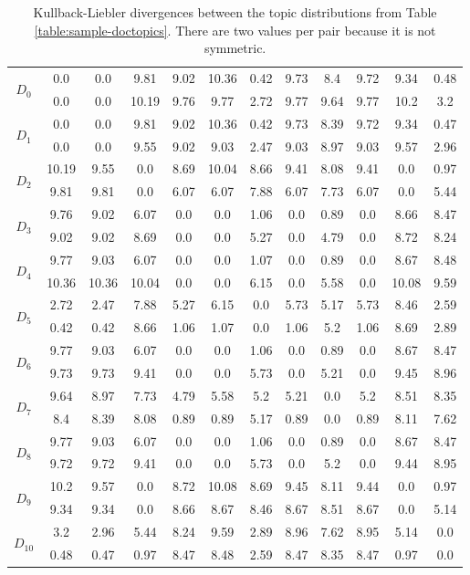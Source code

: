 \begin{table}[!htbp]
\centering%
\small
\begin{tabularx}{\linewidth}{CCCCCCCCCCCC}
\toprule
\heading{} &  &  &  &  &  &  &  &  &  &  &  \\
\midrule
\midrule
{}&0.0&0.0&9.81&9.02&10.36&0.42&9.73&8.4&9.72&9.34&0.48\\
&0.0&0.0&10.19&9.76&9.77&2.72&9.77&9.64&9.77&10.2&3.2\\
\midrule
{}&0.0&0.0&9.81&9.02&10.36&0.42&9.73&8.39&9.72&9.34&0.47\\
&0.0&0.0&9.55&9.02&9.03&2.47&9.03&8.97&9.03&9.57&2.96\\
\midrule
{}&10.19&9.55&0.0&8.69&10.04&8.66&9.41&8.08&9.41&0.0&0.97\\
&9.81&9.81&0.0&6.07&6.07&7.88&6.07&7.73&6.07&0.0&5.44\\
\midrule
{}&9.76&9.02&6.07&0.0&0.0&1.06&0.0&0.89&0.0&8.66&8.47\\
&9.02&9.02&8.69&0.0&0.0&5.27&0.0&4.79&0.0&8.72&8.24\\
\midrule
{}&9.77&9.03&6.07&0.0&0.0&1.07&0.0&0.89&0.0&8.67&8.48\\
&10.36&10.36&10.04&0.0&0.0&6.15&0.0&5.58&0.0&10.08&9.59\\
\midrule
{}&2.72&2.47&7.88&5.27&6.15&0.0&5.73&5.17&5.73&8.46&2.59\\
&0.42&0.42&8.66&1.06&1.07&0.0&1.06&5.2&1.06&8.69&2.89\\
\midrule
{}&9.77&9.03&6.07&0.0&0.0&1.06&0.0&0.89&0.0&8.67&8.47\\
&9.73&9.73&9.41&0.0&0.0&5.73&0.0&5.21&0.0&9.45&8.96\\
\midrule
{}&9.64&8.97&7.73&4.79&5.58&5.2&5.21&0.0&5.2&8.51&8.35\\
&8.4&8.39&8.08&0.89&0.89&5.17&0.89&0.0&0.89&8.11&7.62\\
\midrule
{}&9.77&9.03&6.07&0.0&0.0&1.06&0.0&0.89&0.0&8.67&8.47\\
&9.72&9.72&9.41&0.0&0.0&5.73&0.0&5.2&0.0&9.44&8.95\\
\midrule
{}&10.2&9.57&0.0&8.72&10.08&8.69&9.45&8.11&9.44&0.0&0.97\\
&9.34&9.34&0.0&8.66&8.67&8.46&8.67&8.51&8.67&0.0&5.14\\
\midrule
{}&3.2&2.96&5.44&8.24&9.59&2.89&8.96&7.62&8.95&5.14&0.0\\
&0.48&0.47&0.97&8.47&8.48&2.59&8.47&8.35&8.47&0.97&0.0\\
\midrule
\bottomrule
\end{tabularx}
\caption{Kullback-Liebler divergences between the topic distributions from Table \ref{table:sample-doctopics}. There are two values per pair because it is not symmetric.}
\label{table:kl-distances}
\end{table}

